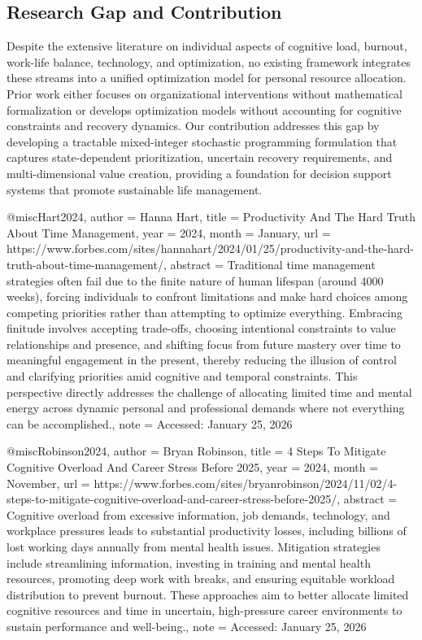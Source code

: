 \subsection{Research Gap and Contribution}

Despite the extensive literature on individual aspects of cognitive load, burnout, work-life balance, technology, and optimization, no existing framework integrates these streams into a unified optimization model for personal resource allocation. Prior work either focuses on organizational interventions without mathematical formalization or develops optimization models without accounting for cognitive constraints and recovery dynamics. Our contribution addresses this gap by developing a tractable mixed-integer stochastic programming formulation that captures state-dependent prioritization, uncertain recovery requirements, and multi-dimensional value creation, providing a foundation for decision support systems that promote sustainable life management.


@misc{Hart2024,
  author = {Hanna Hart},
  title = {Productivity And The Hard Truth About Time Management},
  year = {2024},
  month = {January},
  url = {https://www.forbes.com/sites/hannahart/2024/01/25/productivity-and-the-hard-truth-about-time-management/},
  abstract = {Traditional time management strategies often fail due to the finite nature of human lifespan (around 4000 weeks), forcing individuals to confront limitations and make hard choices among competing priorities rather than attempting to optimize everything. Embracing finitude involves accepting trade-offs, choosing intentional constraints to value relationships and presence, and shifting focus from future mastery over time to meaningful engagement in the present, thereby reducing the illusion of control and clarifying priorities amid cognitive and temporal constraints. This perspective directly addresses the challenge of allocating limited time and mental energy across dynamic personal and professional demands where not everything can be accomplished.},
  note = {Accessed: January 25, 2026}
}

@misc{Robinson2024,
  author = {Bryan Robinson},
  title = {4 Steps To Mitigate Cognitive Overload And Career Stress Before 2025},
  year = {2024},
  month = {November},
  url = {https://www.forbes.com/sites/bryanrobinson/2024/11/02/4-steps-to-mitigate-cognitive-overload-and-career-stress-before-2025/},
  abstract = {Cognitive overload from excessive information, job demands, technology, and workplace pressures leads to substantial productivity losses, including billions of lost working days annually from mental health issues. Mitigation strategies include streamlining information, investing in training and mental health resources, promoting deep work with breaks, and ensuring equitable workload distribution to prevent burnout. These approaches aim to better allocate limited cognitive resources and time in uncertain, high-pressure career environments to sustain performance and well-being.},
  note = {Accessed: January 25, 2026}
}

